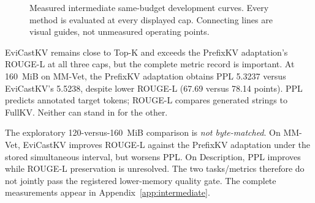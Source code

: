 \documentclass[10pt,letterpaper]{article}
\newcommand{\Evi}{EviCastKV}
\begin{document}
\begin{figure}[htbp]
\centering
{}
\caption{Measured intermediate same-budget development curves. Every
method is evaluated at every displayed cap. Connecting lines are visual
guides, not unmeasured operating points.}
\label{fig:prefixcurves}
\end{figure}

\Evi{} remains close to Top-K and exceeds the PrefixKV adaptation's
ROUGE-L at all three caps, but the complete metric record is important.
At 160~MiB on MM-Vet, the PrefixKV adaptation obtains PPL 5.3237 versus
\Evi's 5.5238, despite lower ROUGE-L (67.69 versus 78.14 points).
PPL predicts annotated target tokens; ROUGE-L compares generated strings
to FullKV. Neither can stand in for the other.

The exploratory 120-versus-160~MiB comparison is \emph{not byte-matched}.
On MM-Vet, \Evi{} improves ROUGE-L against the PrefixKV adaptation under
the stored simultaneous interval, but worsens PPL. On Description, PPL
improves while ROUGE-L preservation is unresolved. The two tasks/metrics
therefore do not jointly pass the registered lower-memory quality gate.
The complete measurements appear in Appendix~\ref{app:intermediate}.
\end{document}
